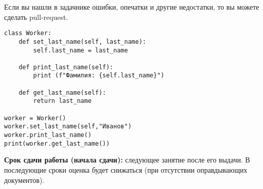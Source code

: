 Если вы нашли в задачнике ошибки, опечатки и другие недостатки, то вы можете сделать pull-request. 

\begin{lstlisting}
class Worker:
    def set_last_name(self, last_name):
        self.last_name = last_name

    def print_last_name(self):
        print (f"Фамилия: {self.last_name}")

    def get_last_name(self):
        return last_name

worker = Worker()
worker.set_last_name(self,"Иванов")
worker.print_last_name()
print(worker.get_last_name())
\end{lstlisting}

\textbf{Срок сдачи работы (начала сдачи):} следующее занятие после его выдачи. В последующие сроки оценка будет снижаться (при отсутствии оправдывающих документов).

